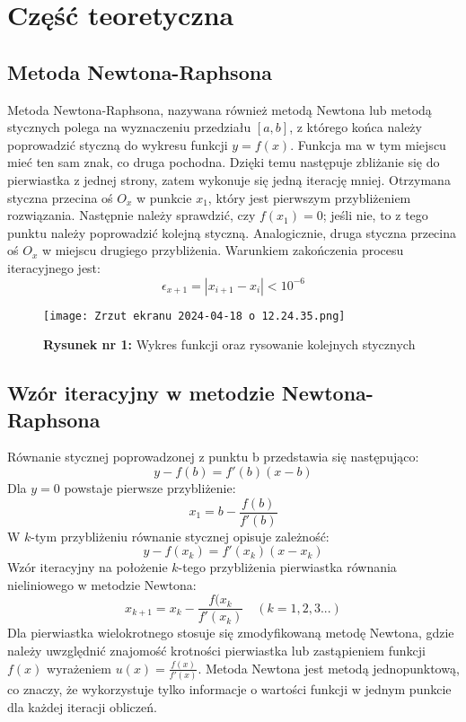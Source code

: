 \documentclass{article}
\begin{document}
\section{Część teoretyczna}

\subsection{Metoda Newtona-Raphsona}
Metoda Newtona-Raphsona, nazywana również metodą Newtona lub metodą stycznych polega na wyznaczeniu przedziału $[a,b]$, z którego końca należy poprowadzić styczną do wykresu funkcji $y=f(x)$. Funkcja ma w tym miejscu mieć ten sam znak, co druga pochodna. Dzięki temu następuje zbliżanie się do pierwiastka z jednej strony, zatem wykonuje się jedną iterację mniej. Otrzymana styczna przecina oś $O_x$ w punkcie $x_1$, który jest pierwszym przybliżeniem rozwiązania. Następnie należy sprawdzić, czy $f(x_1)=0$; jeśli nie, to z tego punktu należy poprowadzić kolejną styczną. Analogicznie, druga styczna przecina oś $O_x$ w miejscu drugiego przybliżenia. Warunkiem zakończenia procesu iteracyjnego jest:
\begin{equation*}
    \epsilon_{x+1} = |x_{i+1} - x_i| < 10^{-6}
\end{equation*}
\begin{figure}[H]
    \centering
    \texttt{[image: Zrzut ekranu 2024-04-18 o 12.24.35.png]}
    \caption{\textbf{Rysunek nr 1:} Wykres funkcji oraz rysowanie kolejnych stycznych}
    \label{fig:enter-label}
\end{figure}
\noindent
\subsection{Wzór iteracyjny w metodzie Newtona-Raphsona}
Równanie stycznej poprowadzonej z punktu b przedstawia się następująco:
\begin{equation*}
    y - f(b) = f'(b)(x-b)
\end{equation*}
\noindent
Dla $y=0$ powstaje pierwsze przybliżenie:
\begin{equation*}
    x_1 = b - \frac{f(b)}{f'(b)}
\end{equation*}
\noindent
W $k$-tym przybliżeniu równanie stycznej opisuje zależność:
\begin{equation*}
    y - f(x_k) = f'(x_k)(x-x_k)
\end{equation*}
\noindent
Wzór iteracyjny na położenie $k$-tego przybliżenia pierwiastka równania nieliniowego w metodzie Newtona:
\begin{equation*}
    x_{k+1} = x_k - \frac{f(x_k}{f'(x_k)} \quad (k=1,2,3...)
\end{equation*}
Dla pierwiastka wielokrotnego stosuje się zmodyfikowaną metodę Newtona, gdzie należy uwzględnić znajomość krotności pierwiastka lub zastąpieniem funkcji $f(x)$ wyrażeniem $u(x) = \frac{f(x)}{f'(x)}$. Metoda Newtona jest metodą jednopunktową, co znaczy, że wykorzystuje tylko informacje o wartości
funkcji w jednym punkcie dla każdej iteracji obliczeń.
\end{document}
